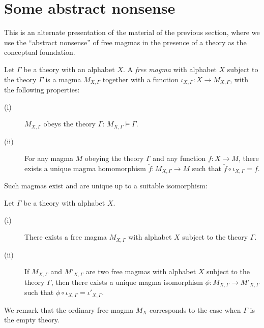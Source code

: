 \chapter{Some abstract nonsense}\label{abstract-nonsense-chapter}

This is an alternate presentation of the material of the previous section, where we use the ``abstract nonsense'' of free magmas in the presence of a theory as the conceptual foundation.

\begin{definition}\label{free-theory}\leanok{}
  Let $\Gamma$ be a theory with an alphabet $X$. A \emph{free magma} with alphabet $X$ subject to the theory $\Gamma$ is a magma $M_{X,\Gamma}$ together with a function $\iota_{X,\Gamma} : X \to M_{X,\Gamma}$, with the following properties:
  \begin{description}
    \item[(i)] $M_{X,\Gamma}$ obeys the theory $\Gamma$: $M_{X,\Gamma} \models \Gamma$.
    \item[(ii)] For any magma $M$ obeying the theory $\Gamma$ and any function $f: X \to M$, there exists a unique magma homomorphism $\tilde{f}: M_{X,\Gamma} \to M$ such that $\tilde{f} \circ \iota_{X,\Gamma} = f$.
  \end{description}
\end{definition}

Such magmas exist and are unique up to a suitable isomorphism:

\begin{theorem}\label{freemag-exist}\leanok
  Let $\Gamma$ be a theory with alphabet $X$.
  \begin{description}
    \item[(i)] There exists a free magma $M_{X,\Gamma}$ with alphabet $X$ subject to the theory $\Gamma$.
    \item[(ii)] If $M_{X,\Gamma}$ and $M'_{X,\Gamma}$ are two free magmas with alphabet $X$ subject to the theory $\Gamma$, then there exists a unique magma isomorphism $\phi: M_{X,\Gamma} \to M'_{X,\Gamma}$ such that $\phi \circ \iota_{X,\Gamma} = \iota'_{X,\Gamma}$.
  \end{description}
\end{theorem}

We remark that the ordinary free magma $M_X$ corresponds to the case when $\Gamma$ is the empty theory.

